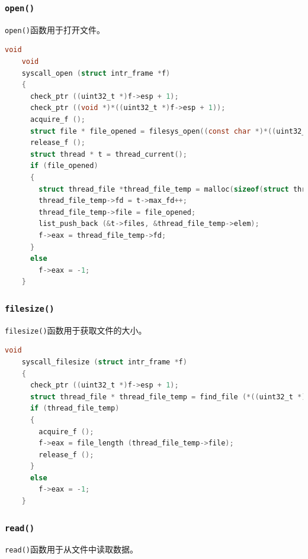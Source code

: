 \documentclass{article}
\begin{document}
\subsubsection{\texttt{open()}}

\texttt{open()}函数用于打开文件。

\begin{lstlisting}[language=C, title=\texttt{src/userprog/syscall.c - syscall\_open()}]
    void
    void
    syscall_open (struct intr_frame *f)
    {
      check_ptr ((uint32_t *)f->esp + 1);
      check_ptr ((void *)*((uint32_t *)f->esp + 1));
      acquire_f ();
      struct file * file_opened = filesys_open((const char *)*((uint32_t *)f->esp + 1));
      release_f ();
      struct thread * t = thread_current();
      if (file_opened)
      {
        struct thread_file *thread_file_temp = malloc(sizeof(struct thread_file));
        thread_file_temp->fd = t->max_fd++;
        thread_file_temp->file = file_opened;
        list_push_back (&t->files, &thread_file_temp->elem);
        f->eax = thread_file_temp->fd;
      } 
      else
        f->eax = -1;
    }
\end{lstlisting}

\subsubsection{\texttt{filesize()}}

\texttt{filesize()}函数用于获取文件的大小。

\begin{lstlisting}[language=C, title=\texttt{src/userprog/syscall.c - syscall\_filesize()}]
    void
    syscall_filesize (struct intr_frame *f)
    {
      check_ptr ((uint32_t *)f->esp + 1);
      struct thread_file * thread_file_temp = find_file (*((uint32_t *)f->esp + 1));
      if (thread_file_temp)
      {
        acquire_f ();
        f->eax = file_length (thread_file_temp->file);
        release_f ();
      } 
      else
        f->eax = -1;
    }
\end{lstlisting}

\subsubsection{\texttt{read()}}

\texttt{read()}函数用于从文件中读取数据。
\end{document}
